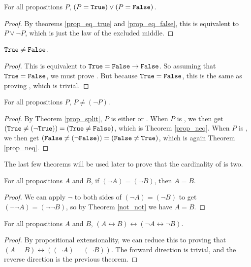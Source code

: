 \documentclass[../math.tex]{subfiles}
\begin{document}
\begin{theorem} \label{prop_split}
    For all propositions $P$, $(P = \vtt{True}) \vee (P = \vtt{False})$.
\end{theorem}
\begin{proof}
    By theorems \ref{prop_eq_true} and \ref{prop_eq_false}, this is equivalent
    to $P \vee \neg P$, which is just the law of the excluded middle.
\end{proof}

\begin{theorem} \label{prop_neq}
    $\vtt{True} \neq \vtt{False}$.
\end{theorem}
\begin{proof}
    This is equivalent to $\vtt{True} = \vtt{False} \rightarrow \vtt{False}$.
    So assuming that $\vtt{True} = \vtt{False}$, we must prove .  But
    because $\vtt{True} = \vtt{False}$, this is the same as proving ,
    which is trivial.
\end{proof}

\begin{theorem}
    For all propositions $P$, $P \neq (\neg P)$.
\end{theorem}
\begin{proof}
    By Theorem \ref{prop_split}, $P$ is either  or .  When
    $P$ is , we then get $(\vtt{True} \neq (\neg \vtt{True})) =
    (\vtt{True} \neq \vtt{False})$, which is Theorem \ref{prop_neq}.  When $P$
    is , we then get $(\vtt{False} \neq (\neg \vtt{False})) =
    (\vtt{False} \neq \vtt{True})$, which is again Theorem \ref{prop_neq}.
\end{proof}
\noindent The last few theorems will be used later to prove that the cardinality
of  is two.

\begin{theorem} \label{not_eq_eq}
    For all propositions $A$ and $B$, if $(\neg A) = (\neg B)$, then $A = B$.
\end{theorem}
\begin{proof}
    We can apply $\neg$ to both sides of $(\neg A) = (\neg B)$ to get $(\neg
    \neg A) = (\neg \neg B)$, so by Theorem \ref{not_not} we have $A = B$.
\end{proof}

\begin{theorem} \label{not_eq_iff}
    For all propositions $A$ and $B$, $(A \leftrightarrow B) \leftrightarrow
    (\neg A \leftrightarrow \neg B)$.
\end{theorem}
\begin{proof}
    By propositional extensionality, we can reduce this to proving that $(A = B)
    \leftrightarrow ((\neg A) = (\neg B))$.  The forward direction is trivial,
    and the reverse direction is the previous theorem.
\end{proof}
\end{document}
